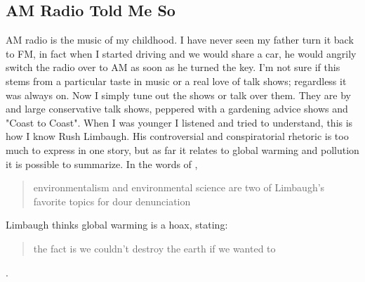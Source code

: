 \documentclass[
    a4paper,
    12pt,
    man,
    donotrepeattitle
]{apa6}
\let \cite \parencite
\begin{document}
\subsection{AM Radio Told Me So}

AM radio is the music of my childhood. I have never seen my father turn it back
to FM, in fact when I started driving and we would share a car, he would
angrily switch the radio over to AM as soon as he turned the key. I'm not sure
if this stems from a particular taste in music or a real love of talk shows;
regardless it was always on. Now I simply tune out the shows or talk over them.
They are by and large conservative talk shows, peppered with a gardening advice
shows and "Coast to Coast". When I was younger I listened and tried to
understand, this is how I know Rush Limbaugh. His controversial and
conspiratorial rhetoric is too much to express in one story, but as far it
relates to global warming and pollution it is possible to summarize. In the
words of \textcite[p. 145]{s4}, \blockquote{environmentalism and 
environmental science are two of Limbaugh's favorite topics for dour 
denunciation}. Limbaugh thinks global warming is a hoax, stating: 
\blockquote{the fact is we couldn't destroy the earth if we wanted to} 
\cite[p. 145]{s4}.
\end{document}
